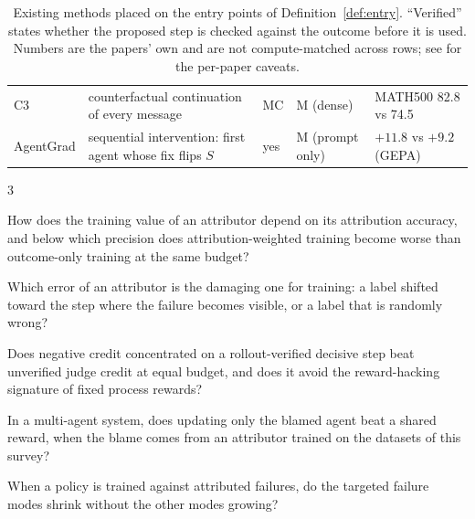 \documentclass[10pt,a4paper]{article}
\begin{document}
\begin{table}[h]
\begin{tabularx}{\linewidth}{@{}l >{\RaggedRight\hsize=1.05\hsize}X l >{\RaggedRight\hsize=0.95\hsize}X l@{}}
C3 \cite{chen2026c3} & counterfactual continuation of every message & MC & M (dense) & MATH500 82.8 vs 74.5 \\
AgentGrad \cite{chu2026agentgrad} & sequential intervention: first agent whose fix flips $S$ & yes & M (prompt only) & $+11.8$ vs $+9.2$ (GEPA) \\\bottomrule
\end{tabularx}
\caption{Existing methods placed on the entry points of Definition~\ref{def:entry}. ``Verified'' states whether the proposed step is checked against the outcome before it is used. Numbers are the papers' own and are not compute-matched across rows; see  for the per-paper caveats.}
\label{tab:entry}
\end{table}

\begin{rqbox}{3}
\begin{description}[leftmargin=3.2em,style=sameline,font=\bfseries,itemsep=1.5pt]
\item[RQ\,3.1] How does the training value of an attributor depend on its attribution accuracy, and below which precision does attribution-weighted training become worse than outcome-only training at the same budget?
\item[RQ\,3.2] Which error of an attributor is the damaging one for training: a label shifted toward the step where the failure becomes visible, or a label that is randomly wrong?
\item[RQ\,3.3] Does negative credit concentrated on a rollout-verified decisive step beat unverified judge credit at equal budget, and does it avoid the reward-hacking signature of fixed process rewards?
\item[RQ\,3.4] In a multi-agent system, does updating only the blamed agent beat a shared reward, when the blame comes from an attributor trained on the datasets of this survey?
\item[RQ\,3.5] When a policy is trained against attributed failures, do the targeted failure modes shrink without the other modes growing?
\end{description}
\end{rqbox}
\end{document}
